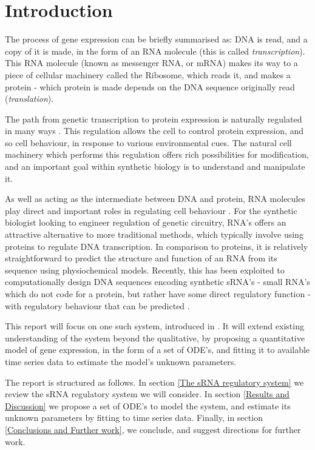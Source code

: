 \documentclass[10pt,journal]{./IEEE_latex_class/IEEEtran}
\begin{document}
\IEEEpeerreviewmaketitle


\section{Introduction}
\label{sec: Intro}
The process of gene expression can be briefly summarised as: DNA is read, and a copy of it is made, in the form of an RNA molecule (this is called \textit{transcription}). This RNA molecule (known as messenger RNA, or mRNA) makes its way to a piece of cellular machinery called the Ribosome, which reads it, and makes a protein - which protein is made depends on the DNA sequence originally read (\textit{translation}).  

 The path from genetic transcription to protein expression is naturally regulated in many ways \cite{MolecularBiology}. This regulation allows the cell to control protein expression, and so cell behaviour, in response to various environmental cues. The natural cell machinery which performs this regulation offers rich possibilities for modification, and an important goal within synthetic biology is to understand and manipulate it.

As well as acting as the intermediate between DNA and protein, RNA molecules play direct and important roles in regulating cell behaviour \cite{Isaacs2006}. For the synthetic biologist looking to engineer regulation of genetic circuitry, RNA's offers an attractive alternative to more traditional methods, which typically involve using proteins to regulate DNA transcription. In comparison to proteins, it is relatively straightforward to predict the structure and function of an RNA from its sequence using physiochemical models. Recently, this has been exploited to computationally design DNA sequences encoding synthetic sRNA's - small RNA's which do not code for a protein, but rather have some direct regulatory function -  with regulatory behaviour that can be predicted \cite{Rodrigo2013}\cite{Rodrigo2012}.

This report will focus on one such system, introduced in \cite{Rodrigo2012}. It will extend existing understanding of the system beyond the qualitative, by proposing a quantitative model of gene expression, in the form of a set of ODE's, and fitting it to available time series data to estimate the model's unknown parameters.

The report is structured as follows. In section \ref{The sRNA regulatory system} we review the sRNA regulatory system we will consider. In section \ref{Results and Discussion} 
we propose a set of ODE's to model the system, and estimate its unknown parameters by fitting to time series data. Finally, in section \ref{Conclusions and Further work}, we conclude, and suggest directions for further work.
\end{document}
